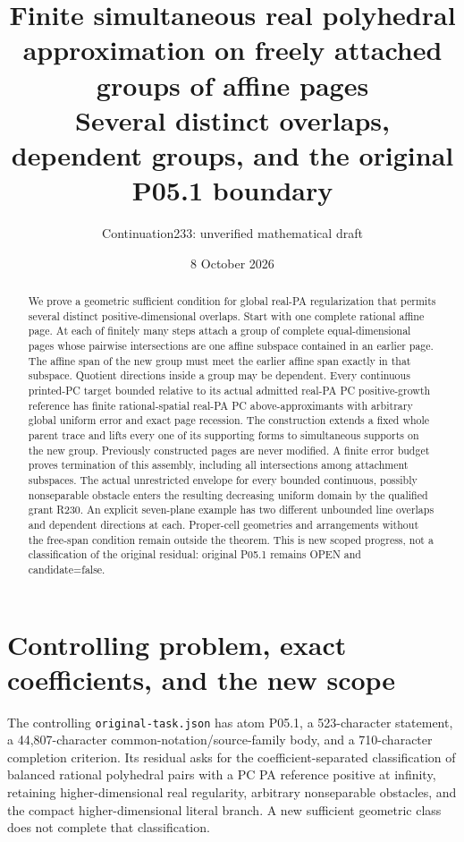 \documentclass[11pt]{article}
\title{Finite simultaneous real polyhedral approximation on freely attached groups of affine pages\\
\large Several distinct overlaps, dependent groups, and the original P05.1 boundary}
\author{Continuation233: unverified mathematical draft}
\date{8 October 2026}
\begin{document}
\maketitle
\begin{abstract}
We prove a geometric sufficient condition for global real-PA regularization that permits several distinct positive-dimensional overlaps. Start with one complete rational affine page. At each of finitely many steps attach a group of complete equal-dimensional pages whose pairwise intersections are one affine subspace contained in an earlier page. The affine span of the new group must meet the earlier affine span exactly in that subspace. Quotient directions inside a group may be dependent. Every continuous printed-PC target bounded relative to its actual admitted real-PA PC positive-growth reference has finite rational-spatial real-PA PC above-approximants with arbitrary global uniform error and exact page recession. The construction extends a fixed whole parent trace and lifts every one of its supporting forms to simultaneous supports on the new group. Previously constructed pages are never modified. A finite error budget proves termination of this assembly, including all intersections among attachment subspaces. The actual unrestricted envelope for every bounded continuous, possibly nonseparable obstacle enters the resulting decreasing uniform domain by the qualified grant R230. An explicit seven-plane example has two different unbounded line overlaps and dependent directions at each. Proper-cell geometries and arrangements without the free-span condition remain outside the theorem. This is new scoped progress, not a classification of the original residual: original P05.1 remains OPEN and candidate=false.
\end{abstract}
\tableofcontents

\section{Controlling problem, exact coefficients, and the new scope}
The controlling \texttt{original-task.json} has atom P05.1, a 523-character statement, a 44,807-character common-notation/source-family body, and a 710-character completion criterion. Its residual asks for the coefficient-separated classification of balanced rational polyhedral pairs with a PC PA reference positive at infinity, retaining higher-dimensional real regularity, arbitrary nonseparable obstacles, and the compact higher-dimensional literal branch. A new sufficient geometric class does not complete that classification.
\end{document}
